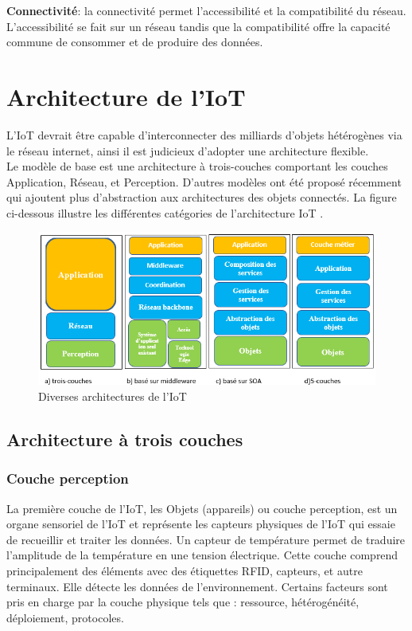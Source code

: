 	\textbf{Connectivité}: la connectivité permet l'accessibilité et la compatibilité du réseau. L'accessibilité se fait sur un réseau tandis que la compatibilité of{\kern0pt}fre la capacité commune de consommer et de produire des données.
	\section{Architecture de l’IoT}	
	L’IoT devrait être capable d’interconnecter des milliards d’objets hétérogènes via le réseau internet, ainsi il est judicieux d’adopter une architecture flexible.\\	
Le modèle de base est une architecture à trois-couches comportant les couches Application, Réseau, et Perception. D’autres modèles ont été proposé récemment qui ajoutent plus d’abstraction aux architectures des objets connectés. La f{\kern0pt}igure ci-dessous illustre les dif{\kern0pt}férentes catégories de l’architecture IoT \cite{al2015iot}.
	\begin{figure}[H]
		\begin{center}
			\includegraphics[width=\textwidth]{IMAGES/ORIGINALS/diverses_architectures_de_l'IoT}
		\end{center}
		\caption{Diverses architectures de l'IoT}
	\end{figure}
	\subsection{Architecture à trois couches}
	\subsubsection{Couche perception }
La première couche de l’IoT, les Objets (appareils) ou couche perception, est un organe sensoriel de l’IoT et représente les capteurs physiques de l’IoT qui essaie de recueillir et traiter les données. Un capteur de température permet de traduire l'amplitude de la température en une tension électrique. Cette couche comprend principalement des éléments avec des étiquettes RFID, capteurs, et autre terminaux. Elle détecte les données de l’environnement. Certains facteurs sont pris en charge par la couche physique tels que : ressource, hétérogénéité, déploiement, protocoles.
